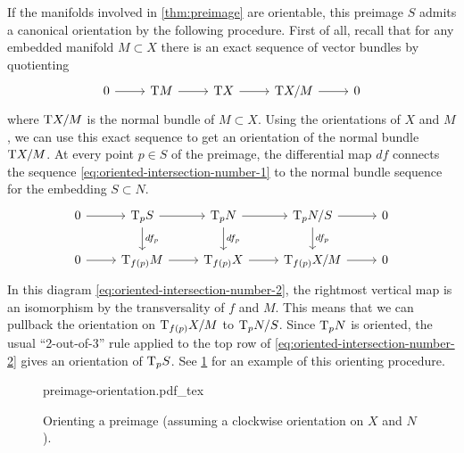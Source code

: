 If the manifolds involved in \cref{thm:preimage} are orientable, this preimage $S$ admits a canonical orientation by the following procedure. First of all, recall that for any embedded manifold $M\subset X$ there is an exact sequence of vector bundles by quotienting
\begin{equation}\label{eq:oriented-intersection-number-1}
	\begin{tikzcd}
		0 & {\T M} & {\T X} & {\T X/M} & 0
		\arrow[from=1-1, to=1-2]
		\arrow[from=1-2, to=1-3]
		\arrow[from=1-3, to=1-4]
		\arrow[from=1-4, to=1-5]
	\end{tikzcd}
\end{equation}
where $\mathrm{T} X/M$ is the normal bundle of $M\subset X$. Using the orientations of $X$ and $M$, we can use this exact sequence to get an orientation of the normal bundle $\mathrm{T} X/M$. At every point $p\in S$ of the preimage, the differential map $df$ connects the sequence \cref{eq:oriented-intersection-number-1} to the normal bundle sequence for the embedding $S\subset N$.
\begin{equation}\label{eq:oriented-intersection-number-2}
	\begin{tikzcd}
		0 & {\T_pS} & {\T_p N} & {\T_p N/S} & 0 \\
		0 & {\T_{f(p)}M} & {\T_{f(p)}X} & {\T_{f(p)}X/M} & 0
		\arrow[from=1-1, to=1-2]
		\arrow[from=1-2, to=1-3]
		\arrow["{df_p}", from=1-2, to=2-2]
		\arrow[from=1-3, to=1-4]
		\arrow["{df_p}", from=1-3, to=2-3]
		\arrow[from=1-4, to=1-5]
		\arrow["{df_p}", from=1-4, to=2-4]
		\arrow[from=2-1, to=2-2]
		\arrow[from=2-2, to=2-3]
		\arrow[from=2-3, to=2-4]
		\arrow[from=2-4, to=2-5]
	\end{tikzcd}
\end{equation}
In this diagram \cref{eq:oriented-intersection-number-2}, the rightmost vertical map is an isomorphism by the transversality of $f$ and $M$. This means that we can pullback the orientation on $\mathrm{T}_{f(p)} X/M$ to $\mathrm{T}_p N/S$. Since $\mathrm{T}_p N$ is oriented, the usual ``2-out-of-3'' rule applied to the top row of \cref{eq:oriented-intersection-number-2} gives an orientation of $\mathrm{T}_p S$. See \cref{fig:preimage-orientation} for an example of this orienting procedure.

\begin{figure}[ht]
	\centering
	{preimage-orientation.pdf_tex}
	\medskip
	\caption{Orienting a preimage (assuming a clockwise orientation on $X$ and $N$).}\label{fig:preimage-orientation}
\end{figure}

